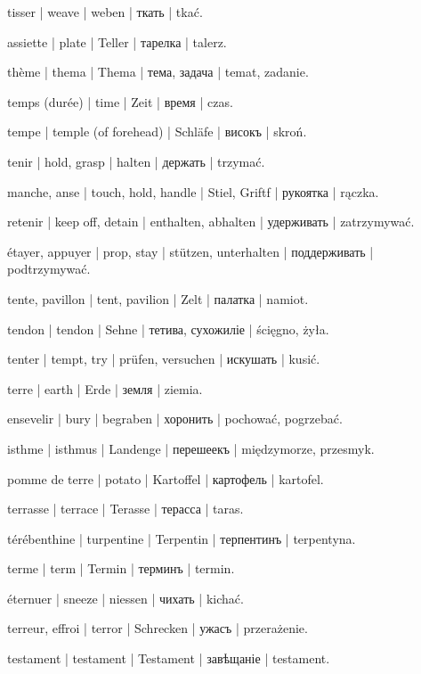 \begin{outdent}{1em}
tisser | weave | weben | ткать | tkać.

assiette | plate | Teller | тарелка | talerz.

thème | thema | Thema | тема, задача | temat, zadanie.

temps (durée) | time | Zeit | время | czas.

tempe | temple (of forehead) | Schläfe | високъ | skroń.

tenir | hold, grasp | halten | держать | trzymać.

\uvsubentry{}
manche, anse | touch, hold, handle | Stiel, Griftf | рукоятка | rączka.


\uvsubentry{}
retenir | keep off, detain | enthalten, abhalten | удерживать | zatrzymywać.


\uvsubentry{}
étayer, appuyer | prop, stay | stützen, unterhalten | поддерживать | podtrzymywać.

tente, pavillon | tent, pavilion | Zelt | палатка | namiot.

tendon | tendon | Sehne | тетива, сухожиліе | ścięgno,
żyła.

tenter | tempt, try | prüfen, versuchen | искушать | kusić.

terre | earth | Erde | земля | ziemia.

\uvsubentry{}
ensevelir | bury | begraben | хоронить | pochować, pogrzebać.


\uvsubentry{}
isthme | isthmus | Landenge | перешеекъ | międzymorze, przesmyk.


\uvsubentry{}
pomme de terre | potato | Kartoffel | картофель | kartofel.

terrasse | terrace | Terasse | терасса | taras.

térébenthine | turpentine | Terpentin | терпентинъ | terpentyna.

terme | term | Termin | терминъ | termin.

éternuer | sneeze | niessen | чихать | kichać.

terreur, effroi | terror | Schrecken | ужасъ | przerażenie.

testament | testament | Testament | завѣщаніе | testament.


\end{outdent}
